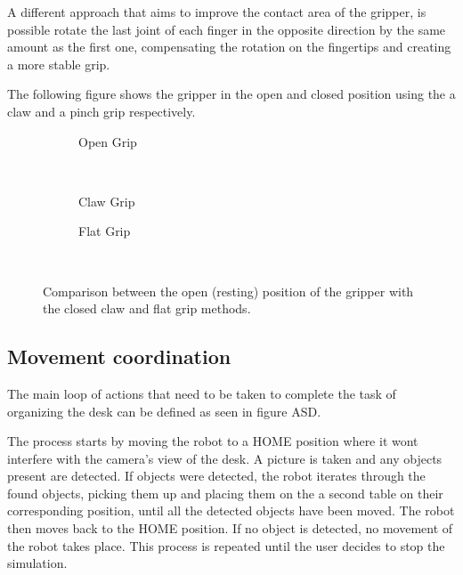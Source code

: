 A different approach that aims to improve the contact area of the gripper, is possible rotate the last joint of each finger in the opposite direction by the same amount as the first one, compensating the rotation on the fingertips and creating a more stable grip.

The following figure shows the gripper in the open and closed position using the a claw and a pinch grip respectively.


\begin{figure}[!h]
    \centering
    \begin{subfigure}[b]{0.5\textwidth}
        \caption{Open Grip}
    \end{subfigure}\\\vspace{0.5cm}
    
    \begin{subfigure}[b]{0.4\textwidth}
        \caption{Claw Grip}
    \end{subfigure}
    \hfill
    \begin{subfigure}[b]{0.4\textwidth}
        \caption{Flat Grip}
    \end{subfigure}\\\vspace{0.5cm}

    \caption{Comparison between the open (resting) position of the gripper with the closed claw and flat grip methods.}
    \label{fig:grip_states}
\end{figure}

\subsection{Movement coordination}

The main loop of actions that need to be taken to complete the task of organizing the desk can be defined as seen in figure ASD. 

The process starts by moving the robot to a HOME position where it wont interfere with the camera's view of the desk. A picture is taken and any objects present are detected. If objects were detected, the robot iterates through the found objects, picking them up and placing them on the a second table on their corresponding position, until all the detected objects have been moved. The robot then moves back to the HOME position. If no object is detected, no movement of the robot takes place. This process is repeated until the user decides to stop the simulation.


